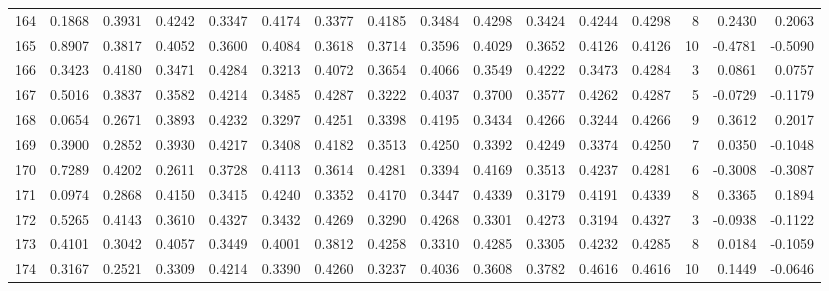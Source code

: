 \begin{tabular}{lrrrrrrrrrrrrrrr}
164 &      0.1868 &  0.3931 &  0.4242 &  0.3347 &  0.4174 &  0.3377 &  0.4185 &  0.3484 &  0.4298 &  0.3424 &   0.4244 &     0.4298 &      8 &                    0.2430 &                     0.2063 \\
165 &      0.8907 &  0.3817 &  0.4052 &  0.3600 &  0.4084 &  0.3618 &  0.3714 &  0.3596 &  0.4029 &  0.3652 &   0.4126 &     0.4126 &     10 &                   -0.4781 &                    -0.5090 \\
166 &      0.3423 &  0.4180 &  0.3471 &  0.4284 &  0.3213 &  0.4072 &  0.3654 &  0.4066 &  0.3549 &  0.4222 &   0.3473 &     0.4284 &      3 &                    0.0861 &                     0.0757 \\
167 &      0.5016 &  0.3837 &  0.3582 &  0.4214 &  0.3485 &  0.4287 &  0.3222 &  0.4037 &  0.3700 &  0.3577 &   0.4262 &     0.4287 &      5 &                   -0.0729 &                    -0.1179 \\
168 &      0.0654 &  0.2671 &  0.3893 &  0.4232 &  0.3297 &  0.4251 &  0.3398 &  0.4195 &  0.3434 &  0.4266 &   0.3244 &     0.4266 &      9 &                    0.3612 &                     0.2017 \\
169 &      0.3900 &  0.2852 &  0.3930 &  0.4217 &  0.3408 &  0.4182 &  0.3513 &  0.4250 &  0.3392 &  0.4249 &   0.3374 &     0.4250 &      7 &                    0.0350 &                    -0.1048 \\
170 &      0.7289 &  0.4202 &  0.2611 &  0.3728 &  0.4113 &  0.3614 &  0.4281 &  0.3394 &  0.4169 &  0.3513 &   0.4237 &     0.4281 &      6 &                   -0.3008 &                    -0.3087 \\
171 &      0.0974 &  0.2868 &  0.4150 &  0.3415 &  0.4240 &  0.3352 &  0.4170 &  0.3447 &  0.4339 &  0.3179 &   0.4191 &     0.4339 &      8 &                    0.3365 &                     0.1894 \\
172 &      0.5265 &  0.4143 &  0.3610 &  0.4327 &  0.3432 &  0.4269 &  0.3290 &  0.4268 &  0.3301 &  0.4273 &   0.3194 &     0.4327 &      3 &                   -0.0938 &                    -0.1122 \\
173 &      0.4101 &  0.3042 &  0.4057 &  0.3449 &  0.4001 &  0.3812 &  0.4258 &  0.3310 &  0.4285 &  0.3305 &   0.4232 &     0.4285 &      8 &                    0.0184 &                    -0.1059 \\
174 &      0.3167 &  0.2521 &  0.3309 &  0.4214 &  0.3390 &  0.4260 &  0.3237 &  0.4036 &  0.3608 &  0.3782 &   0.4616 &     0.4616 &     10 &                    0.1449 &                    -0.0646 \\

\end{tabular}
